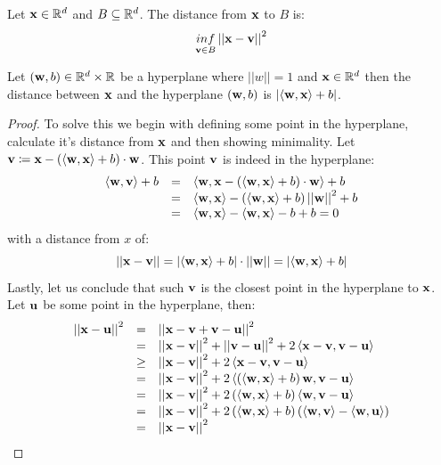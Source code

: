 \begin{definition}
	Let $\x\in\R^d$ and $B\subseteq\R^d$. The distance from $\x$ to $B$ is: $$\underset{\vv{v}\in B}{inf} \norm{\x-\vv{v}}^2 $$
\end{definition}

\begin{exercise}
	Let $\left(\w,b\right)\in \R^d\times\R$ be a hyperplane where $\left|\left|w\right|\right|=1$ and $\x\in\R^d$ then the distance between $\x$ and the hyperplane $\left(\w,b\right)$ is $\left|\inprod{\w}{\x}+b\right|$.
\end{exercise}
\begin{proof}
	To solve this we begin with defining some point in the hyperplane, calculate it's distance from $\x$ and then showing minimality. Let $\vv{v}\coloneqq\x-\left(\inprod{\w}{\x}+b\right)\cdot\w$. This point $\vv{v}$ is indeed in the hyperplane: 
	$$
	\begin{array}{ccl}
		\inprod{\w}{\vv{v}}+b & = & \inprod{\w}{\x-\left(\inprod{\w}{\x}+b\right)\cdot\w}+b\\
		& = & \inprod{\w}{\x}-\left(\inprod{\w}{\x}+b\right)\norm{\w}^{2}+b\\
		& = & \inprod{\w}{\x}-\inprod{\w}{\x}-b+b=0
	\end{array}
	$$
	with a distance from $x$  of: $$ \norm{\x-\vv{v}}=\left|\inprod{\w}{\x}+b\right|\cdot\norm{\w} = \left|\inprod{\w}{\x}+b\right|$$ 
	Lastly, let us conclude that such $\vv{v}$ is the closest point in the hyperplane to $\x$. Let $\vv{u}$ be some point in the hyperplane, then:
	$$
	\begin{array}{ccl}
		\norm{\x-\vv{u}}^{2} & = & \norm{\x-\vv{v}+\vv{v}-\vv{u}}^{2}\\
		& = & \norm{\x-\vv{v}}^{2}+\norm{\vv{v}-\vv{u}}^{2}+2\inprod{\x-\vv{v}}{\vv{v}-\vv{u}}\\
		& \geq & \norm{\x-\vv{v}}^{2}+2\inprod{\x-\vv{v}}{\vv{v}-\vv{u}}\\
		& = & \norm{\x-\vv{v}}^{2}+2\inprod{\left(\inprod{\w}{\x}+b\right)\w}{\vv{v}-\vv{u}}\\
		& = & \norm{\x-\vv{v}}^{2}+2\left(\inprod{\w}{\x}+b\right)\inprod{\w}{\vv{v}-\vv{u}}\\
		& = & \norm{\x-\vv{v}}^{2}+2\left(\inprod{\w}{\x}+b\right)\left(\inprod{\w}{\vv{v}}-\inprod{\w}{\vv{u}}\right)\\
		& = & \norm{\x-\vv{v}}^{2}
	\end{array}
	$$
\end{proof}


